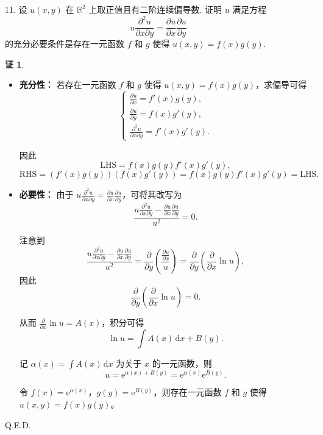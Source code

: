 \documentclass[a4paper,12pt]{article}
\theoremstyle{definition}
\newtheorem*{pf}{证}
\begin{document}
11. 设 $u(x,y)$ 在 $\mathbb{R}^2$ 上取正值且有二阶连续偏导数. 证明 $u$ 满足方程
$$
    u \frac{\partial^2 u}{\partial x \partial y} = \frac{\partial u}{\partial x} \frac{\partial u}{\partial y}
$$
的充分必要条件是存在一元函数 $f$ 和 $g$ 使得 $u(x,y) = f(x)g(y)$.
\begin{pf}
    \begin{itemize}
        \item \textbf{充分性：} 若存在一元函数 $f$ 和 $g$ 使得 $u(x,y) = f(x)g(y)$，求偏导可得
              $$
                  \begin{cases}
                      \displaystyle\frac{\partial u}{\partial x}=f'(x)g(y), \\[8pt]
                      \displaystyle\frac{\partial u}{\partial y}=f(x)g'(y), \\[8pt]
                      \displaystyle\frac{\partial^2 u}{\partial x \partial y}=f'(x)g'(y).
                  \end{cases}
              $$

              因此
              $$
                  \text{LHS}=f(x)g(y)f'(x)g'(y),
              $$
              $$
                  \text{RHS}=(f'(x)g(y))(f(x)g'(y))=f(x)g(y)f'(x)g'(y)=\text{LHS}.
              $$

        \item \textbf{必要性：} 由于 $u \frac{\partial^2 u}{\partial x \partial y} = \frac{\partial u}{\partial x} \frac{\partial u}{\partial y}$，可将其改写为
              $$
                  \frac{u \frac{\partial^2 u}{\partial x \partial y} - \frac{\partial u}{\partial x} \frac{\partial u}{\partial y}}{u^2}=0.
              $$

              注意到
              $$
                  \frac{u \frac{\partial^2 u}{\partial x \partial y} - \frac{\partial u}{\partial x} \frac{\partial u}{\partial y}}{u^2}=\frac{\partial}{\partial y}\left(\frac{\frac{\partial u}{\partial x}}{u}\right)=\frac{\partial}{\partial y}\left(\frac{\partial}{\partial x}\ln u\right),
              $$
              因此
              $$
                  \frac{\partial}{\partial y}\left(\frac{\partial}{\partial x}\ln u\right)=0.
              $$

              从而 $\frac{\partial}{\partial x}\ln u=A(x)$，积分可得
              $$
                  \ln u=\int A(x)\,\mathrm{d}x + B(y).
              $$

              记 $\alpha(x)=\int A(x)\,\mathrm{d}x$ 为关于 $x$ 的一元函数，则
              $$
                  u=\mathrm{e}^{\alpha(x)+B(y)}=\mathrm{e}^{\alpha(x)}\mathrm{e}^{B(y)}.
              $$

              令 $f(x)=\mathrm{e}^{\alpha(x)}$，$g(y)=\mathrm{e}^{B(y)}$，则存在一元函数 $f$ 和 $g$ 使得 $u(x,y) = f(x)g(y)$。
    \end{itemize}

    Q.E.D.
\end{pf}
\end{document}
